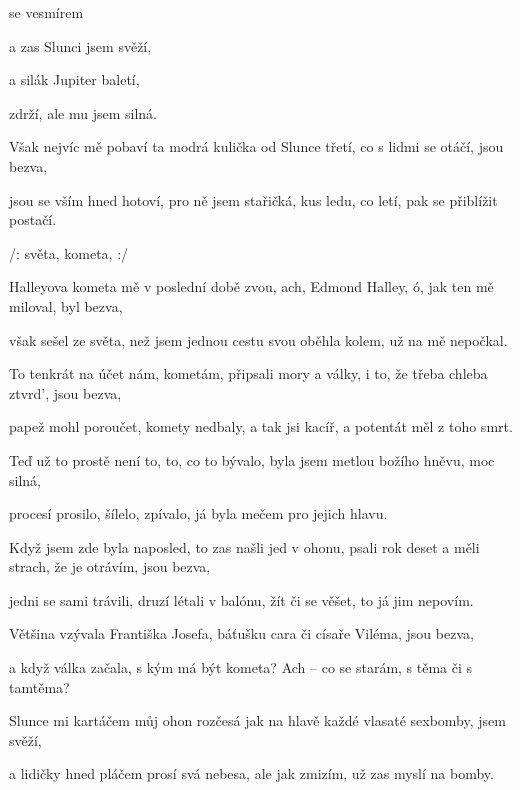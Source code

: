 

\zs
{} se vesmírem 

 a zas  Slunci  jsem svěží,

a silák Jupiter  baletí,

 zdrží, ale  mu  jsem silná.
\ks

\zs
Však nejvíc mě pobaví ta modrá kulička od Slunce třetí, co s lidmi se otáčí, jsou bezva,

jsou se vším hned hotoví, pro ně jsem stařičká, kus ledu, co letí, pak se přiblížit postačí.
\ks

\zr
/:  světa,  kometa,    :/
\kr

\zs
Halleyova kometa mě v poslední době zvou, ach, Edmond Halley, ó, jak ten mě miloval, byl bezva,

však sešel ze světa, než jsem jednou cestu svou oběhla kolem, už na mě nepočkal.
\ks

\zr\kr

\zs
To tenkrát na účet nám, kometám, připsali mory a války, i to, že třeba chleba ztvrd', jsou bezva,

papež mohl poroučet, komety nedbaly, a tak jsi kacíř, a potentát měl z toho smrt.

Teď už to prostě není to, to, co to bývalo, byla jsem metlou božího hněvu, moc silná,

procesí prosilo, šílelo, zpívalo, já byla mečem pro jejich hlavu.
\ks

\zr\kr

\zs
Když jsem zde byla naposled, to zas našli jed v ohonu, psali rok deset a měli strach, že je otrávím, jsou bezva,

jedni se sami trávili, druzí létali v balónu, žít či se věšet, to já jim nepovím.

Většina vzývala Františka Josefa, báťušku cara či císaře Viléma, jsou bezva,

a když válka začala, s kým má být kometa?  Ach -- co se starám, s těma či s tamtěma?
\ks

\zr\kr

\zs
Slunce mi kartáčem můj ohon rozčesá jak na hlavě každé vlasaté sexbomby, jsem svěží,

a lidičky hned pláčem prosí svá nebesa, ale jak zmizím, už zas myslí na bomby.
\ks

